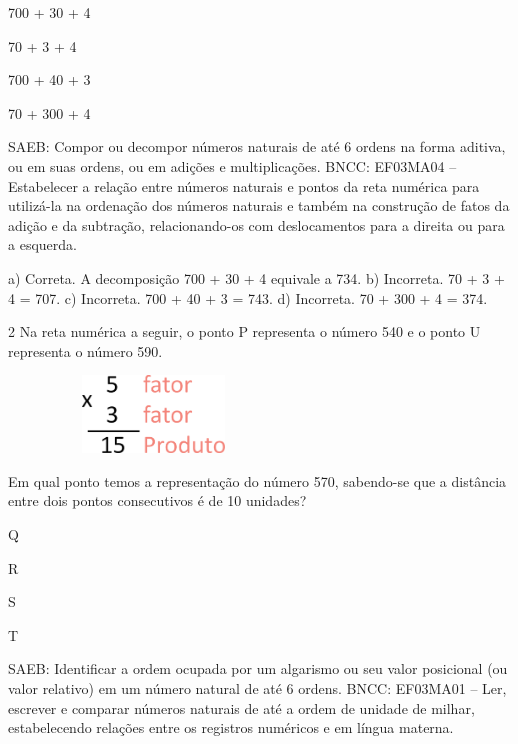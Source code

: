 \begin{escolha}

\item
  700 + 30 + 4
\item
  70 + 3 + 4
\item
  700 + 40 + 3
\item
  70 + 300 + 4
\end{escolha}

SAEB: Compor ou decompor números naturais de até 6 ordens na forma aditiva, ou em suas ordens, ou em adições e multiplicações.
BNCC: EF03MA04 -- Estabelecer a relação entre números naturais e pontos da reta numérica para
utilizá-la na ordenação dos números naturais e também na construção de fatos da adição e da
subtração, relacionando-os com deslocamentos para a direita ou para a esquerda.


a) Correta. A decomposição 700 + 30 + 4 equivale a 734.
b) Incorreta. 70 + 3 + 4 = 707.
c) Incorreta. 700 + 40 + 3 = 743.
d) Incorreta. 70 + 300 + 4 = 374.


\num{2} Na reta numérica a seguir, o ponto P representa o número 540 e o ponto U
representa o número 590.

\includegraphics[width=3.03205in,height=0.81228in]{media/image12.png}


Em qual ponto temos a representação do número 570, sabendo-se que a
distância entre dois pontos consecutivos é de 10 unidades?

\begin{escolha}

\item
  Q
\item
  R
\item
  S
\item
  T
\end{escolha}

SAEB: Identificar a ordem ocupada por um algarismo ou seu valor posicional (ou valor relativo) em um número natural de até 6 ordens.
BNCC: EF03MA01 -- Ler, escrever e comparar números naturais de até a ordem de unidade de milhar, estabelecendo relações entre os registros numéricos e em língua materna.

